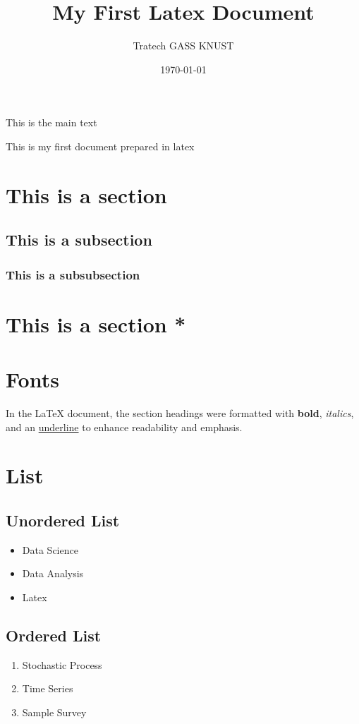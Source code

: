 \documentclass{article}
\title{My First Latex Document}
\author{Tratech GASS KNUST}
\date{\today}
\begin{document}
	\maketitle

	This is the main text %
	
	This is my first document prepared in latex
	
	\section{This is a section}
	\subsection{This is a subsection}
	\subsubsection{This is a subsubsection}
	\section*{This is a section *}
	
	\section{Fonts}
	In the LaTeX document, the section headings were formatted with \textbf{bold}, \textit{italics}, and an \underline{underline} to enhance readability and emphasis.
	
	\section{List}
	\subsection{Unordered List}
	\begin{itemize}
		\item Data Science
		\item Data Analysis
		\item Latex
	\end{itemize}
	
	\subsection{Ordered List}
	\begin{enumerate}
		\item Stochastic Process
		\item Time Series
		\item Sample Survey
	\end{enumerate}
\end{document}
